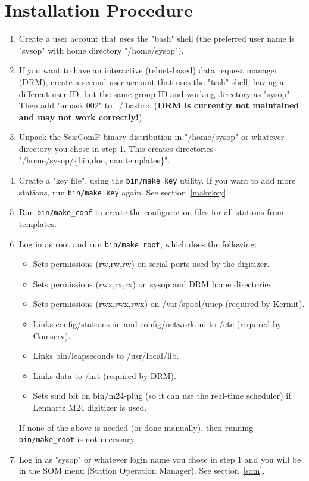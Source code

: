 \documentclass[11pt,a4paper,titlepage]{article}
\begin{document}
\section{Installation Procedure}

\begin{enumerate}
\item Create a user account that uses the "bash" shell (the preferred
user name is "sysop" with home directory "/home/sysop").

\item If you want to have an interactive (telnet-based) data request
manager (DRM), create a second user account that uses the "tcsh"
shell, having a different user ID, but the same group ID and working
directory as "sysop".  Then add "umask 002" to ~/.bashrc. (\textbf{DRM
is currently not maintained and may not work correctly!})

\item Unpack the SeisComP binary distribution in "/home/sysop" or
whatever directory you chose in step 1. This creates directories
"/home/sysop/\{bin,doc,man,templates\}".

\item Create a "key file", using the \verb+bin/make_key+ utility. If
you want to add more stations, run \verb+bin/make_key+ again. See
section~\ref{makekey}.

\item Run \verb+bin/make_conf+ to create the configuration files for all
stations from templates.

\item Log in as root and run \verb+bin/make_root+, which does the
following:
\begin{itemize}
\item Sets permissions (rw,rw,rw) on serial ports used by the digitizer.

\item Sets permissions (rwx,rx,rx) on sysop and DRM home directories.

\item Sets permissions (rwx,rwx,rwx) on /var/spool/uucp (required by Kermit).

\item Links config/stations.ini and config/network.ini to /etc (required by
Comserv).

\item Links bin/leapseconds to /usr/local/lib.

\item Links data to /nrt (required by DRM).

\item Sets suid bit on bin/m24-plug (so it can use the real-time
scheduler) if Lennartz M24 digitizer is used.
\end{itemize}

If none of the above is needed (or done manually), then running
\verb+bin/make_root+ is not necessary.

\item Log in as "sysop" or whatever login name you chose in step 1 and
you will be in the SOM menu (Station Operation Manager). See
section~\ref{som}.
\end{enumerate}
\end{document}
